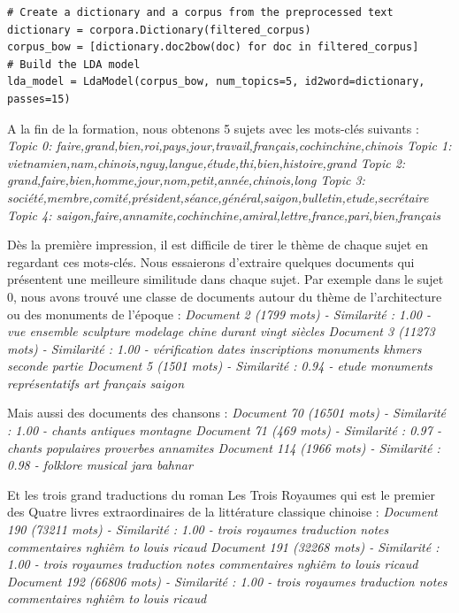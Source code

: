 \begin{lstlisting}
# Create a dictionary and a corpus from the preprocessed text
dictionary = corpora.Dictionary(filtered_corpus)
corpus_bow = [dictionary.doc2bow(doc) for doc in filtered_corpus]
# Build the LDA model
lda_model = LdaModel(corpus_bow, num_topics=5, id2word=dictionary, passes=15)
\end{lstlisting}

A la fin de la formation, nous obtenons 5 sujets avec les mots-clés suivants :\newline
\textit{Topic 0: faire,grand,bien,roi,pays,jour,travail,français,cochinchine,chinois \newline
Topic 1: vietnamien,nam,chinois,nguy,langue,étude,thi,bien,histoire,grand\newline
Topic 2: grand,faire,bien,homme,jour,nom,petit,année,chinois,long\newline
Topic 3: société,membre,comité,président,séance,général,saigon,bulletin,etude,secrétaire\newline
Topic 4: saigon,faire,annamite,cochinchine,amiral,lettre,france,pari,bien,français}

Dès la première impression, il est difficile de tirer le thème de chaque sujet en regardant ces mots-clés. Nous essaierons d'extraire quelques documents qui présentent une meilleure similitude dans chaque sujet. Par exemple dans le sujet 0, nous avons trouvé une classe de documents autour du thème de l'architecture ou des monuments de l'époque :\newline
\textit{Document 2 (1799 mots) - Similarité : 1.00 - vue ensemble sculpture modelage chine durant vingt siècles\newline
  Document 3 (11273 mots) - Similarité : 1.00 - vérification dates inscriptions monuments khmers seconde partie\newline
  Document 5 (1501 mots) - Similarité : 0.94 - etude monuments représentatifs art français saigon\newline
}

Mais aussi des documents des chansons :\newline
  \textit{Document 70 (16501 mots) - Similarité : 1.00 - chants antiques montagne\newline
  Document 71 (469 mots) - Similarité : 0.97 - chants populaires proverbes annamites\newline
  Document 114 (1966 mots) - Similarité : 0.98 - folklore musical jara bahnar}

Et les trois grand traductions du roman Les Trois Royaumes qui est le premier des Quatre livres extraordinaires de la littérature classique chinoise :\newline
\textit{Document 190 (73211 mots) - Similarité : 1.00 - trois royaumes traduction notes commentaires nghiêm to louis ricaud\newline
  Document 191 (32268 mots) - Similarité : 1.00 - trois royaumes traduction notes commentaires nghiêm to louis ricaud\newline
  Document 192 (66806 mots) - Similarité : 1.00 - trois royaumes traduction notes commentaires nghiêm to louis ricaud}

